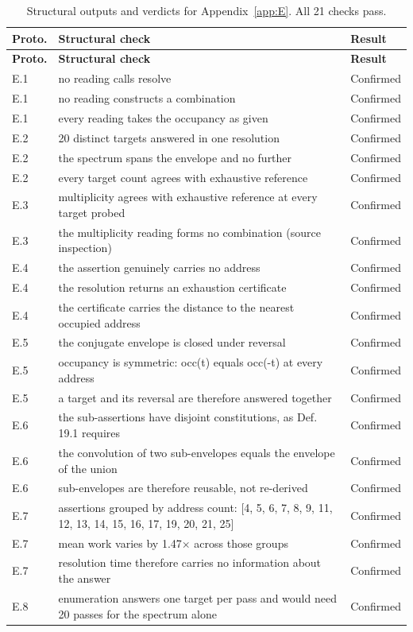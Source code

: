 \documentclass[pdflatex,sn-mathphys-num]{sn-jnl}
\theoremstyle{thmstyleone}%
\theoremstyle{thmstyletwo}%
\theoremstyle{thmstylethree}%
\begin{document}
\begin{appendices}
\begingroup\small\renewcommand{\arraystretch}{1.25}
\begin{longtable}{@{} p{} p{} p{} @{}}
\caption{Structural outputs and verdicts for Appendix~\ref{app:E}. All 21 checks pass.}\label{tab:appE_results}\\
\toprule
\textbf{Proto.} & \textbf{Structural check} & \textbf{Result} \\
\midrule
\endfirsthead
\toprule
\textbf{Proto.} & \textbf{Structural check} & \textbf{Result} \\
\midrule
\endhead
\bottomrule
\endfoot
E.1 & no reading calls resolve & Confirmed \\
E.1 & no reading constructs a combination & Confirmed \\
E.1 & every reading takes the occupancy as given & Confirmed \\
E.2 & 20 distinct targets answered in one resolution & Confirmed \\
E.2 & the spectrum spans the envelope and no further & Confirmed \\
E.2 & every target count agrees with exhaustive reference & Confirmed \\
E.3 & multiplicity agrees with exhaustive reference at every target probed & Confirmed \\
E.3 & the multiplicity reading forms no combination (source inspection) & Confirmed \\
E.4 & the assertion genuinely carries no address & Confirmed \\
E.4 & the resolution returns an exhaustion certificate & Confirmed \\
E.4 & the certificate carries the distance to the nearest occupied address & Confirmed \\
E.5 & the conjugate envelope is closed under reversal & Confirmed \\
E.5 & occupancy is symmetric: occ(t) equals occ(-t) at every address & Confirmed \\
E.5 & a target and its reversal are therefore answered together & Confirmed \\
E.6 & the sub-assertions have disjoint constitutions, as Def. 19.1 requires & Confirmed \\
E.6 & the convolution of two sub-envelopes equals the envelope of the union & Confirmed \\
E.6 & sub-envelopes are therefore reusable, not re-derived & Confirmed \\
E.7 & assertions grouped by address count: [4, 5, 6, 7, 8, 9, 11, 12, 13, 14, 15, 16, 17, 19, 20, 21, 25] & Confirmed \\
E.7 & mean work varies by 1.47$\times$ across those groups & Confirmed \\
E.7 & resolution time therefore carries no information about the answer & Confirmed \\
E.8 & enumeration answers one target per pass and would need 20 passes for the spectrum alone & Confirmed \\
\end{longtable}\endgroup


\end{appendices}
\end{document}
